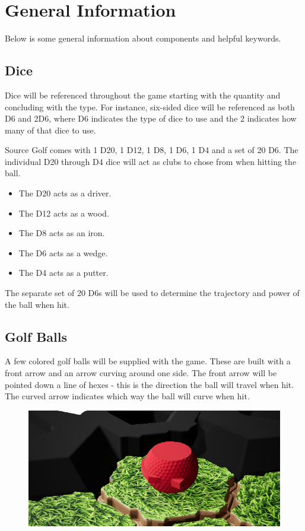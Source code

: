 \documentclass[../main.tex]{subfiles}
\begin{document}
\section{General Information}
Below is some general information about components and helpful keywords. 

\subsection{Dice}
Dice will be referenced throughout the game starting with the quantity and concluding with the type. For instance, six-sided dice will be referenced as both D6 and 2D6, where D6 indicates the type of dice to use and the 2 indicates how many of that dice to use. 

Source Golf comes with 1 D20, 1 D12, 1 D8, 1 D6, 1 D4 and a set of 20 D6. 
The individual D20 through D4 dice will act as clubs to chose from when hitting the ball.

\begin{itemize}
    \item The D20 acts as a driver. 
    \item The D12 acts as a wood. 
    \item The D8 acts as an iron. 
    \item The D6 acts as a wedge. 
    \item The D4 acts as a putter. 
\end{itemize}

 The separate set of 20 D6s will be used to determine the trajectory and power of the ball when hit. 

\subsection{Golf Balls}
A few colored golf balls will be supplied with the game. These are built with a front arrow and an arrow curving around one side. The front arrow will be pointed down a line of hexes - this is the direction the ball will travel when hit. The curved arrow indicates which way the ball will curve when hit.  

\begin{figure}[h]
    \includegraphics[width=1\linewidth]{chapters//generalInformation/Source Golf Ball.png}
\end{figure}
\end{document}
